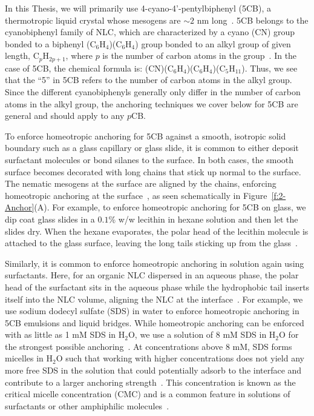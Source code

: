 In this Thesis, we will primarily use 4-cyano-4'-pentylbiphenyl (5CB), a thermotropic liquid crystal whose mesogens are $\sim 2$ nm long~\cite{RN33}.\@
5CB belongs to the cyanobiphenyl family of NLC, which are characterized by a cyano (CN) group  bonded to a biphenyl (C$_6$H$_4$)(C$_6$H$_4$) group bonded to an alkyl group of given length, C$_p$H$_{2p+1}$, where $p$ is the number of carbon atoms in the group~\cite{RN33}.
In the case of 5CB, the chemical formula is: (CN)(C$_6$H$_4$)(C$_6$H$_4$)(C$_5$H$_{11}$).
Thus, we see that the ``5'' in 5CB refers to the number of carbon atoms in the alkyl group.
Since the different cyanobiphenyls generally only differ in the number of carbon atoms in the alkyl group, the anchoring techniques we cover below for 5CB are general and should apply to any $p$CB.

To enforce homeotropic anchoring for 5CB against a smooth, isotropic solid boundary such as a glass capillary or glass slide, it is common to either deposit surfactant molecules or bond silanes to the surface.
In both cases, the smooth surface becomes decorated with long chains that stick up normal to the surface.
The nematic mesogens at the surface are aligned by the chains, enforcing homeotropic anchoring at the surface~\cite{RN33}, as seen schematically in Figure~\ref{f:2-Anchor}(A).
For example, to enforce homeotropic anchoring for 5CB on glass, we dip coat glass slides in a $0.1$\% w/w lecithin in hexane solution and then let the slides dry.
When the hexane evaporates, the polar head of the lecithin molecule is attached to the glass surface, leaving the long tails sticking up from the glass~\cite{RN140}.

Similarly, it is common to enforce homeotropic anchoring in solution again using surfactants.
Here, for an organic NLC dispersed in an aqueous phase, the polar head of the surfactant sits in the aqueous phase while the hydrophobic tail inserts itself into the NLC volume, aligning the NLC at the interface~\cite{RN150,RN235}.
For example, we use sodium dodecyl sulfate (SDS) in water to enforce homeotropic anchoring in 5CB emulsions and liquid bridges.
While homeotropic anchoring can be enforced with as little as 1 mM SDS in H$_2$O, we use a solution of 8 mM SDS in H$_2$O for the strongest possible anchoring~\cite{RN235}.
At concentrations above 8 mM, SDS forms micelles in H$_2$O such that working with higher concentrations does not yield any more free SDS in the solution that could potentially adsorb to the interface and contribute to a larger anchoring strength~\cite{RN234}.
This concentration is known as the critical micelle concentration (CMC) and is a common feature in solutions of surfactants or other amphiphilic molecules~\cite{RN233,RN234}. \\

